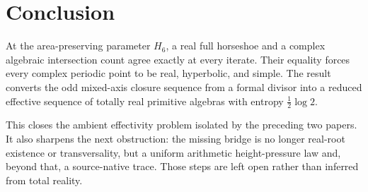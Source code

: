 \section{Conclusion}\label{sec:conclusion}

At the area-preserving parameter $H_6$, a real full horseshoe and a complex
algebraic intersection count agree exactly at every iterate.  Their equality
forces every complex periodic point to be real, hyperbolic, and simple.  The
result converts the odd mixed-axis closure sequence from a formal divisor
into a reduced effective sequence of totally real primitive algebras with
entropy $\tfrac12\log2$.

This closes the ambient effectivity problem isolated by the preceding two
papers.  It also sharpens the next obstruction: the missing bridge is no
longer real-root existence or transversality, but a uniform arithmetic
height-pressure law and, beyond that, a source-native trace.  Those steps are
left open rather than inferred from total reality.

